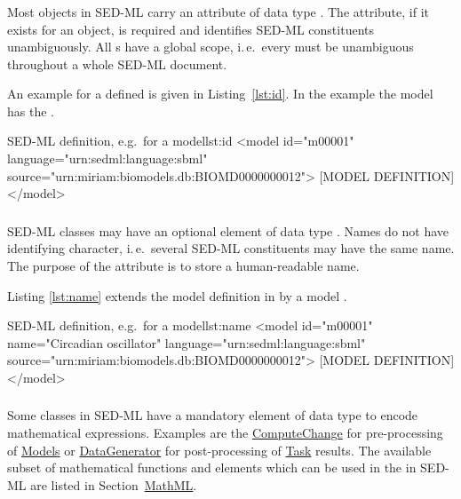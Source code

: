 \subsubsection{}
\label{sec:id}
Most objects in SED-ML carry an  attribute of data type \hyperref[type:sid]{}. The  attribute, if it exists for an object, is required and identifies SED-ML constituents unambiguously. All s have a global scope, i.\,e.\ every  must be unambiguous throughout a whole SED-ML document.

An example for a defined  is given in Listing~\ref{lst:id}. In the example the model has the  .

\begin{myXmlLst}{SED-ML  definition, e.g.\ for a model}{lst:id}
<model id="m00001" language="urn:sedml:language:sbml" source="urn:miriam:biomodels.db:BIOMD0000000012">
	[MODEL DEFINITION]
</model>
\end{myXmlLst}


\subsubsection{}
\label{sec:name}
SED-ML classes may have an optional element  of data type . Names do not have identifying character, i.\,e.\ several SED-ML constituents may have the same name. The purpose of the  attribute is to store a human-readable name.

Listing \ref{lst:name} extends the model definition in  by a model .

\begin{myXmlLst}{SED-ML  definition, e.g.\ for a model}{lst:name}
<model id="m00001" name="Circadian oscillator" language="urn:sedml:language:sbml" source="urn:miriam:biomodels.db:BIOMD0000000012">
	[MODEL DEFINITION]
</model>
\end{myXmlLst}


\subsubsection{}
\label{sec:math}
Some classes in SED-ML have a mandatory element  of data type \hyperref[type:mathml]{} to encode mathematical expressions. Examples are the \hyperref[class:computeChange]{ComputeChange} for pre-processing of \hyperref[class:model]{Models} or \hyperref[class:dataGenerator]{DataGenerator} for post-processing of \hyperref[class:task]{Task} results.
The available subset of mathematical functions and elements which can be used in the  in SED-ML are listed in Section~\hyperref[sec:mathML]{MathML}.

